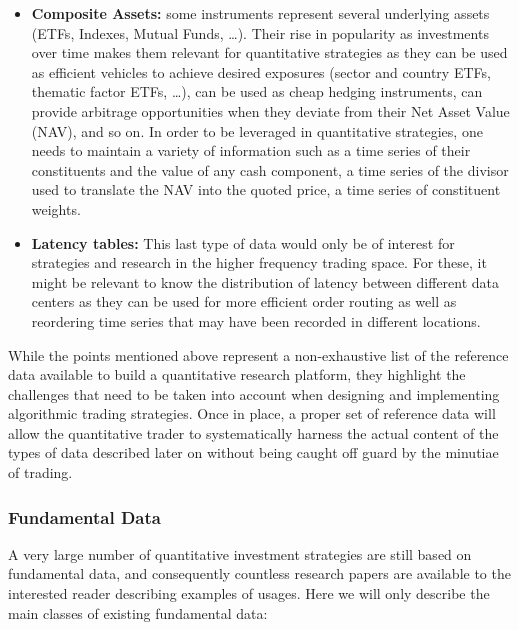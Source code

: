 \begin{itemize}
\item \textbf{Composite Assets:} some instruments represent several underlying assets (ETFs, Indexes, Mutual Funds, \dots). Their rise in popularity as investments over time makes them relevant for quantitative strategies as they can be used as efficient vehicles to achieve desired exposures (sector and country ETFs, thematic factor ETFs, \dots), can be used as cheap hedging instruments, can provide arbitrage opportunities when they deviate from their Net Asset Value (NAV), and so on. 
In order to be leveraged in quantitative strategies, one needs to maintain a variety of information such as a time series of their constituents and the value of any cash component, a time series of the divisor used to translate the NAV into the quoted price, a time series of constituent weights. 


\item \textbf{Latency tables:} This last type of data would only be of interest for strategies and research in the higher frequency trading space. For these, it might be relevant to know the distribution of latency between different data centers as they can be used for more efficient order routing as well as reordering time series that may have been recorded in different locations.
\end{itemize}


While the points mentioned above represent a non-exhaustive list of the reference data available to build a quantitative research platform, they highlight the challenges that need to be taken into account when designing and implementing algorithmic trading strategies. Once in place, a proper set of reference data will allow the quantitative trader to systematically harness the actual content of the types of data described later on without being caught off guard by the minutiae of trading.


\subsubsection{Fundamental Data}


A very large number of quantitative investment strategies are still based on fundamental data, and consequently countless research papers are available to the interested reader describing examples of usages. Here we will only describe the main classes of existing fundamental data:

